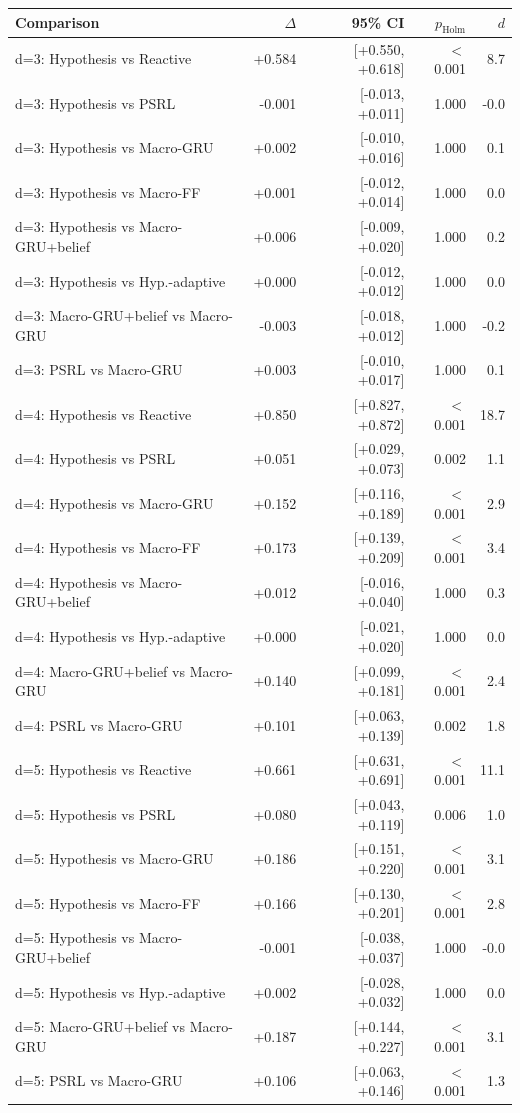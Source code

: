 \begin{tabular}{lrrrr}
\toprule
Comparison & $\Delta$ & 95\% CI & $p_{\text{Holm}}$ & $d$ \\
\midrule
d=3: Hypothesis vs Reactive & +0.584 & [+0.550, +0.618] & $<$0.001 & 8.7 \\
d=3: Hypothesis vs PSRL & -0.001 & [-0.013, +0.011] & 1.000 & -0.0 \\
d=3: Hypothesis vs Macro-GRU & +0.002 & [-0.010, +0.016] & 1.000 & 0.1 \\
d=3: Hypothesis vs Macro-FF & +0.001 & [-0.012, +0.014] & 1.000 & 0.0 \\
d=3: Hypothesis vs Macro-GRU+belief & +0.006 & [-0.009, +0.020] & 1.000 & 0.2 \\
d=3: Hypothesis vs Hyp.-adaptive & +0.000 & [-0.012, +0.012] & 1.000 & 0.0 \\
d=3: Macro-GRU+belief vs Macro-GRU & -0.003 & [-0.018, +0.012] & 1.000 & -0.2 \\
d=3: PSRL vs Macro-GRU & +0.003 & [-0.010, +0.017] & 1.000 & 0.1 \\
d=4: Hypothesis vs Reactive & +0.850 & [+0.827, +0.872] & $<$0.001 & 18.7 \\
d=4: Hypothesis vs PSRL & +0.051 & [+0.029, +0.073] & 0.002 & 1.1 \\
d=4: Hypothesis vs Macro-GRU & +0.152 & [+0.116, +0.189] & $<$0.001 & 2.9 \\
d=4: Hypothesis vs Macro-FF & +0.173 & [+0.139, +0.209] & $<$0.001 & 3.4 \\
d=4: Hypothesis vs Macro-GRU+belief & +0.012 & [-0.016, +0.040] & 1.000 & 0.3 \\
d=4: Hypothesis vs Hyp.-adaptive & +0.000 & [-0.021, +0.020] & 1.000 & 0.0 \\
d=4: Macro-GRU+belief vs Macro-GRU & +0.140 & [+0.099, +0.181] & $<$0.001 & 2.4 \\
d=4: PSRL vs Macro-GRU & +0.101 & [+0.063, +0.139] & 0.002 & 1.8 \\
d=5: Hypothesis vs Reactive & +0.661 & [+0.631, +0.691] & $<$0.001 & 11.1 \\
d=5: Hypothesis vs PSRL & +0.080 & [+0.043, +0.119] & 0.006 & 1.0 \\
d=5: Hypothesis vs Macro-GRU & +0.186 & [+0.151, +0.220] & $<$0.001 & 3.1 \\
d=5: Hypothesis vs Macro-FF & +0.166 & [+0.130, +0.201] & $<$0.001 & 2.8 \\
d=5: Hypothesis vs Macro-GRU+belief & -0.001 & [-0.038, +0.037] & 1.000 & -0.0 \\
d=5: Hypothesis vs Hyp.-adaptive & +0.002 & [-0.028, +0.032] & 1.000 & 0.0 \\
d=5: Macro-GRU+belief vs Macro-GRU & +0.187 & [+0.144, +0.227] & $<$0.001 & 3.1 \\
d=5: PSRL vs Macro-GRU & +0.106 & [+0.063, +0.146] & $<$0.001 & 1.3 \\
\bottomrule
\end{tabular}
